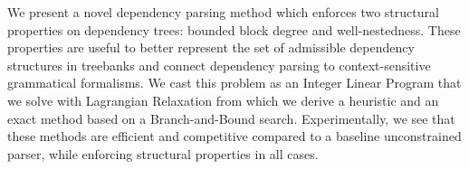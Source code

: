 We present a novel dependency parsing method which enforces two structural properties on dependency trees: bounded block degree and well-nestedness. These properties are useful to better represent the set of admissible dependency structures in treebanks and connect dependency parsing to context-sensitive grammatical formalisms. We cast this problem as an Integer Linear Program that we solve with Lagrangian Relaxation from which we derive a heuristic and an exact method based on a Branch-and-Bound search. Experimentally, we see that these methods are efficient and competitive compared to a baseline unconstrained parser, while enforcing structural properties in all cases.
